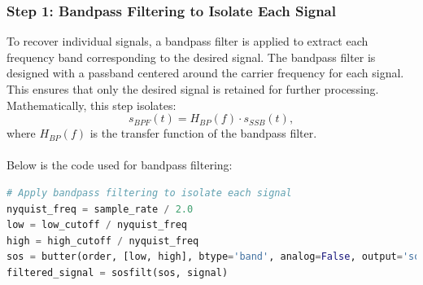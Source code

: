 \documentclass[12pt,a4paper]{article}
\begin{document}
\subsubsection{Step 1: Bandpass Filtering to Isolate Each Signal}
To recover individual signals, a bandpass filter is applied to extract each frequency band corresponding to the desired signal. The bandpass filter is designed with a passband centered around the carrier frequency for each signal. This ensures that only the desired signal is retained for further processing. Mathematically, this step isolates:
\[ s_{BPF}(t) = H_{BP}(f) \cdot s_{SSB}(t), \]
where \( H_{BP}(f) \) is the transfer function of the bandpass filter. \\
\\
Below is the code used for bandpass filtering:
\begin{lstlisting}[language=Python, caption=Bandpass Filtering Code]
# Apply bandpass filtering to isolate each signal
nyquist_freq = sample_rate / 2.0
low = low_cutoff / nyquist_freq
high = high_cutoff / nyquist_freq
sos = butter(order, [low, high], btype='band', analog=False, output='sos')
filtered_signal = sosfilt(sos, signal)
\end{lstlisting}
\end{document}
